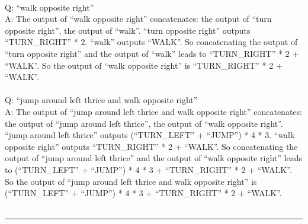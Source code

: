 {\\
Q: ``walk opposite right'' \\
A: The output of ``walk opposite right'' concatenates: the output of ``turn opposite right'', the output of ``walk''. ``turn opposite right'' outputs ``TURN\_RIGHT'' * 2. ``walk'' outputs ``WALK''. So concatenating the output of ``turn opposite right'' and the output of ``walk'' leads to ``TURN\_RIGHT'' * 2 + ``WALK''. So the output of ``walk opposite right'' is ``TURN\_RIGHT'' * 2 + ``WALK''. \\
\\
Q: ``jump around left thrice and walk opposite right'' \\
A: The output of ``jump around left thrice and walk opposite right'' concatenates: the output of ``jump around left thrice'', the output of ``walk opposite right''. ``jump around left thrice'' outputs (``TURN\_LEFT'' + ``JUMP'') * 4 * 3. ``walk opposite right'' outputs ``TURN\_RIGHT'' * 2 + ``WALK''. So concatenating the output of ``jump around left thrice'' and the output of ``walk opposite right'' leads to (``TURN\_LEFT'' + ``JUMP'') * 4 * 3 + ``TURN\_RIGHT'' * 2 + ``WALK''. So the output of ``jump around left thrice and walk opposite right'' is (``TURN\_LEFT'' + ``JUMP'') * 4 * 3 + ``TURN\_RIGHT'' * 2 + ``WALK''. \\
\\
\hrule \bigskip
}

